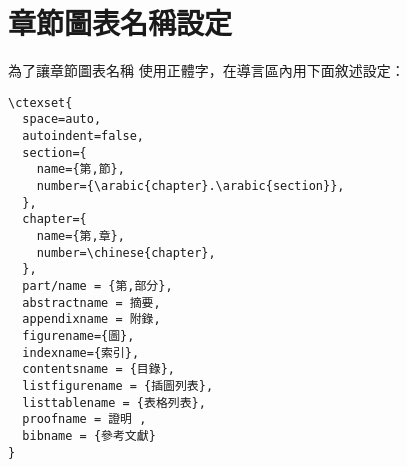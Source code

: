 \section{章節圖表名稱設定}
為了讓章節圖表名稱
使用正體字，在導言區內用下面敘述設定：
\begin{verbatim}
\ctexset{
  space=auto,
  autoindent=false,
  section={
    name={第,節},
    number={\arabic{chapter}.\arabic{section}},
  },
  chapter={
    name={第,章},
    number=\chinese{chapter},
  },
  part/name = {第,部分},
  abstractname = 摘要,
  appendixname = 附錄,
  figurename={圖},
  indexname={索引},
  contentsname = {目錄},
  listfigurename = {插圖列表},
  listtablename = {表格列表},
  proofname = 證明 ,
  bibname = {參考文獻}
}

\end{verbatim}
